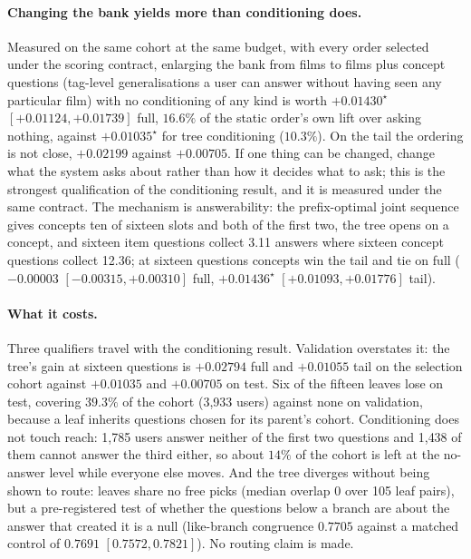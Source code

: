 \documentclass[runningheads]{llncs}
\begin{document}
\paragraph{Changing the bank yields more than conditioning does.}
Measured on the same cohort at the same budget, with every order selected under the scoring contract,
enlarging the bank from films to films plus concept questions (tag-level generalisations a user
can answer without having seen any particular film) with no conditioning of any kind is worth
$+0.01430^\star$ $[+0.01124,+0.01739]$ full, $16.6\%$ of the static order's own lift over asking
nothing, against $+0.01035^\star$ for tree conditioning ($10.3\%$). On the tail the ordering is not close, $+0.02199$ against $+0.00705$. If one
thing can be changed, change what the system asks about rather than how it decides what to ask; this
is the strongest qualification of the conditioning result, and it is measured under the same contract. The mechanism is answerability: the prefix-optimal joint sequence gives concepts ten of sixteen
slots and both of the first two, the tree opens on a concept, and sixteen item questions collect 3.11
answers where sixteen concept questions collect 12.36; at sixteen questions concepts win the tail and
tie on full ($-0.00003$ $[-0.00315,+0.00310]$ full, $+0.01436^\star$ $[+0.01093,+0.01776]$ tail).

\paragraph{What it costs.}
Three qualifiers travel with the conditioning result. Validation overstates it: the tree's gain at
sixteen questions is $+0.02794$ full and $+0.01055$ tail on the selection cohort against $+0.01035$
and $+0.00705$ on test. Six of the fifteen leaves lose on test, covering $39.3\%$ of the cohort
(3{,}933 users) against none on validation, because a leaf inherits questions chosen for its parent's
cohort. Conditioning does not touch reach: 1{,}785 users answer neither of the first two questions
and 1{,}438 of them cannot answer the third either, so about $14\%$ of the cohort is left at the
no-answer level while everyone else moves. And the tree diverges without being shown to route: leaves share no free picks (median overlap
$0$ over 105 leaf pairs), but a pre-registered test of whether the questions below a branch are about
the answer that created it is a null (like-branch congruence $0.7705$ against a matched control of
$0.7691$ $[0.7572,0.7821]$). No routing claim is made.
\end{document}
